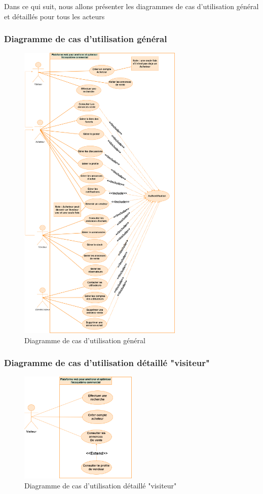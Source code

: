 \documentclass[edit,12pt,a4paper,ChapStyle,oneside,doubleinterligne]{report}
\begin{document}
Dans ce qui suit, nous allons présenter les diagrammes de cas d'utilisation général et détaillés pour tous les acteurs
\clearpage
\subsubsection{Diagramme de cas d'utilisation général}
\begin{figure}[h!]\label{fig:Diagramme de cas d'utilisation}
\centering
\includegraphics[width=0.7\textwidth]{images/diagramme de cas g 1.png}
\caption{Diagramme de cas d'utilisation général}
\end{figure}
\newpage
\subsubsection{Diagramme de cas d'utilisation détaillé "visiteur" }
\begin{figure}[h!]\label{fig:Diagramme de cas d'utilisation détaillé "visiteur"}
\centering
\includegraphics[width=0.5\textwidth]{images/diagramme de cas v1.png}
\caption{Diagramme de cas d'utilisation détaillé "visiteur"}
\end{figure}
\end{document}
